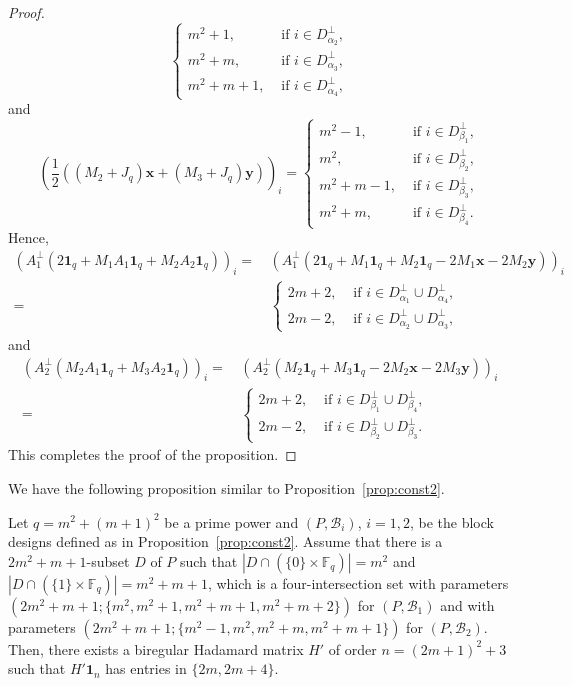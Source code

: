 \documentclass[ALCO,ThmDefs,Unicode]{cedram}
\newcommand*\F{{\mathbb F}}
\newcommand*{\un}{\mathbf{1}}
\newcommand*{\bfx}{\mathbf{x}}
\newcommand*{\bfy}{\mathbf{y}}
\begin{document}
\begin{proof}
\[\begin{cases}
m^2+1,& \text{ if } i\in D_{\alpha_2}^\perp,\\
m^2+m,& \text{ if } i\in D_{\alpha_3}^\perp, \\
m^2+m+1,& \text{ if } i\in D_{\alpha_4}^\perp,
\end{cases}
\]
and
\[
\left(\frac{1}{2}((M_2+J_q)\bfx+(M_3+J_q)\bfy)\right)_i=
\begin{cases}
m^2-1,& \text{ if } i\in D_{\beta_1}^\perp,\\
m^2,& \text{ if } i\in D_{\beta_2}^\perp,\\
m^2+m-1,& \text{ if } i\in D_{\beta_3}^\perp, \\
m^2+m,& \text{ if } i\in D_{\beta_4}^\perp.
\end{cases}
\]
Hence,
\begin{align*}
\left(A_1^\perp (2\un_q+M_1A_1\un_q+M_2A_2\un_q)\right)_i=&\,
\left(A_1^\perp (2\un_q+M_1\un_q+M_2\un_q-2M_1\bfx-2M_2\bfy)\right)_i\\
=&\,
\begin{cases}
2m+2,& \text{ if } i\in D_{\alpha_1}^\perp \cup D_{\alpha_4}^\perp,\\
2m-2,& \text{ if } i\in D_{\alpha_2}^\perp \cup D_{\alpha_3}^\perp,
\end{cases}
\end{align*}
and
\begin{align*}
\left(A_2^\perp (M_2A_1\un_q+M_3A_2\un_q)\right)_i=&\,
\left(A_2^\perp (M_2\un_q+M_3\un_q-2M_2\bfx-2M_3\bfy)\right)_i\\
=&\,
\begin{cases}
2m+2,& \text{ if } i\in D_{\beta_1}^\perp \cup D_{\beta_4}^\perp,\\
2m-2,& \text{ if } i\in D_{\beta_2}^\perp \cup D_{\beta_3}^\perp.
\end{cases}
\end{align*}
This completes the proof of the proposition.
\end{proof}

We have the following proposition similar to Proposition~\ref{prop:const2}.

\begin{prop}\label{prop:const3}
Let $q=m^2+(m+1)^2$ be a prime power and $(P,{\mathcal B}_i)$, $i=1,2$, be the block designs defined as in Proposition~\ref{prop:const2}. Assume that there is a $2m^2+m+1$-subset $D$ of $P$ such that $|D\cap (\{0\}\times \F_q)|=m^2$ and $|D\cap (\{1\}\times \F_q)|=m^2+m+1$, which is a four-intersection set with parameters $(2m^2+m+1;\{m^2,m^2+1,m^2+m+1,m^2+m+2\})$ for $(P,{\mathcal B}_1)$ and with parameters $(2m^2+m+1;\{m^2-1,m^2,m^2+m,m^2+m+1\})$ for $(P,{\mathcal B}_2)$. Then, there exists a biregular Hadamard matrix $H'$ of order $n=(2m+1)^2+3$ such that $H'\un_{n}$ has entries in $\{2m,2m+4\}$.
\end{prop}
\end{document}
